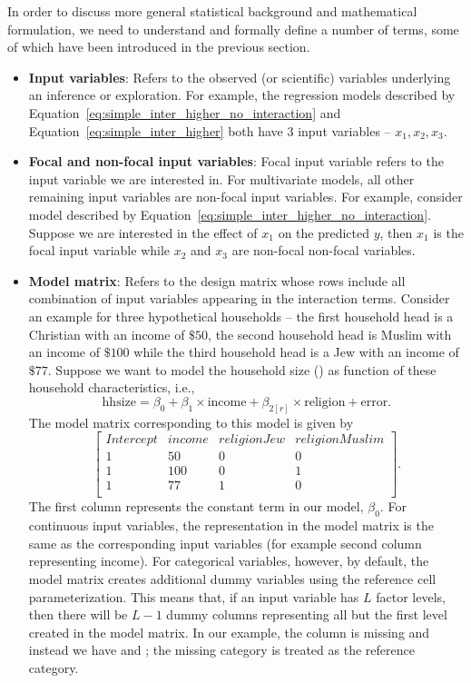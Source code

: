 In order to discuss more general statistical background and mathematical formulation, we need to understand and formally define a number of terms, some of which have been introduced in the previous section.

\begin{itemize}
\item \textbf{Input variables}: Refers to the observed (or scientific) variables underlying an inference or exploration. For example, the regression models described by Equation~\ref{eq:simple_inter_higher_no_interaction} and Equation~\ref{eq:simple_inter_higher} both have $3$ input variables -- $x_1, x_2, x_3$.
\item \textbf{Focal and non-focal input variables}: Focal input variable refers to the input variable we are interested in. For multivariate models, all other remaining input variables are non-focal input variables. For example, consider model described by Equation~\ref{eq:simple_inter_higher_no_interaction}. Suppose we are interested in the effect of $x_1$ on the predicted $y$, then $x_1$ is the focal input variable while $x_2$ and $x_3$ are non-focal non-focal variables.
\item \textbf{Model matrix}: Refers to the design matrix whose rows include all combination of input variables appearing in the interaction terms. Consider an example for three hypothetical households -- the first household head is a Christian with an income of $\$ 50$, the second household head is Muslim with an income of $\$ 100$ while the third household head is a Jew with an income of $\$ 77$. Suppose we want to model the household size () as function of these household characteristics, i.e., $$\mathrm{hhsize} = \beta_0 + \beta_1\times\mathrm{income} + \beta_{2[r]}\times\mathrm{religion} + \mathrm{error}.$$ The model matrix corresponding to this model is given by
$$\begin{bmatrix}{}
 Intercept & income & religionJew & religionMuslim \\
 1 & 50 & 0 & 0 \\
  1 & 100 & 0 & 1 \\
  1 & 77 & 1 & 0 \\
\end{bmatrix}.$$ The first column represents the constant term in our model, $\beta_0$. For continuous input variables, the representation in the model matrix is the same as the corresponding input variables (for example second column representing income). For categorical variables, however, by default, the model matrix  creates additional dummy variables using the reference cell parameterization. This means that, if an input variable has $L$ factor levels, then there will be $L-1$ dummy columns representing all but the first level created in the model matrix. In our example, the column  is missing and instead we have  and ; the missing category  is treated as the reference category.

\end{itemize}
